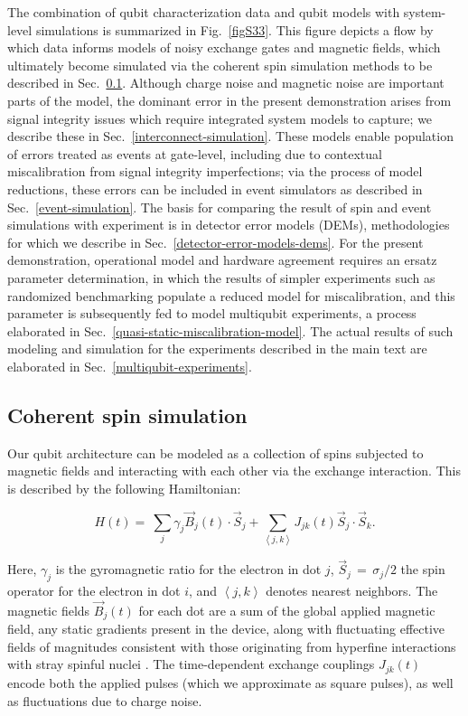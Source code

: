\documentclass[aps,prl,twocolumn,superscriptaddress,nobibnotes,10pt,floatfix]{revtex4-2}
\newcommand{\secref}[1]{Sec.~\ref{#1}}
\newcommand{\figref}[1]{Fig.~\ref{#1}}
\begin{document}
The combination of qubit characterization data and qubit models with system-level simulations is summarized in \figref{figS33}.
This figure depicts a flow by which data informs models of noisy exchange gates and magnetic fields, which ultimately become simulated via the coherent spin simulation methods to be described in \secref{coherent-spin-simulation}.
Although charge noise and magnetic noise are important parts of the model, the dominant error in the present demonstration arises from signal integrity issues which require integrated system models to capture; we describe these in \secref{interconnect-simulation}.
These models enable population of errors treated as events at gate-level, including due to contextual miscalibration from signal integrity imperfections; via the process of model reductions, these errors can be included in event simulators as described in \secref{event-simulation}.
The basis for comparing the result of spin and event simulations with experiment is in detector error models (DEMs), methodologies for which we describe in \secref{detector-error-models-dems}.
For the present demonstration, operational model and hardware agreement requires an ersatz parameter determination, in which the results of simpler experiments such as randomized benchmarking populate a reduced model for miscalibration, and this parameter is subsequently fed to model multiqubit experiments, a process elaborated in \secref{quasi-static-miscalibration-model}.
The actual results of such modeling and simulation for the experiments described in the main text are elaborated in \secref{multiqubit-experiments}.

\subsection{Coherent spin simulation}\label{coherent-spin-simulation}

Our qubit architecture can be modeled as a collection of spins subjected to magnetic fields and interacting with each other via the exchange interaction.
This is described by the following Hamiltonian:

\begin{equation}\label{eq:pyquest_hamiltonian}
H(t) = \ \sum_{j}^{}{\gamma_{j}{\vec{B}_{j}}(t) \cdot {\vec{S}}_{j}} + \sum_{\left\langle j,k \right\rangle}^{}{J_{jk}(t){\vec{S}}_{j} \cdot {\vec{S}}_{k}}.
\end{equation}

Here, \(\gamma_{j}\) is the gyromagnetic ratio for the electron in dot \(j\), \({\vec{S}}_{j}\, = \,{\sigma}_{j}\text{/}2\) the spin operator for the electron in dot \(i\), and \(\left\langle j,k \right\rangle\) denotes nearest neighbors.
The magnetic fields \({\vec{B}}_{j}(t)\) for each dot are a sum of the global applied magnetic field, any static gradients present in the device, along with fluctuating effective fields of magnitudes consistent with those originating from hyperfine interactions with stray spinful nuclei \cite{s_kerckhoff_magnetic_2021}.
The time-dependent exchange couplings \(J_{jk}(t)\) encode both the applied pulses (which we approximate as square pulses), as well as fluctuations due to charge noise.
\end{document}
